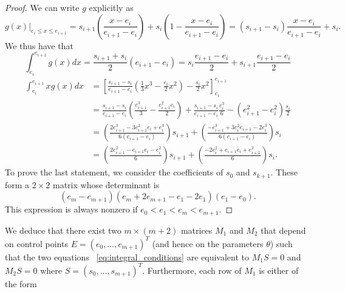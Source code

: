 \documentclass{article}
\begin{document}
\begin{proof} We can write $g$ explicitly as
\begin{equation}
g(x)|_{e_i \le x \le e_{i+1}} = s_{i+1} \left(\frac{x-e_i}{e_{i+1}-e_i}\right)
+ s_ {i} \left(1 -
\frac{x-e_i}{e_{i+1}-e_i}\right) = (s_{i+1} - s_i)\frac{x - e_i}{e_{i+1} - e_i}
+ s_i.
\end{equation}
We thus have that
\begin{equation}
\int_{e_i}^{e_{i+1}} g(x) dx = \frac{s_{i+1} + s_i}{2} (e_{i+1} - e_i) = s_i
\frac{e_{i+1} - e_i}{2} + s_{i+1}\frac{e_{i+1} - e_i}{2}
\end{equation}
\begin{equation}
\begin{aligned}
\int_{e_i}^{e_{i+1}} x g(x) dx &= \left[\frac{s_{i+1} - s_i}{e_{i+1} -
e_i}\left(\frac{1}{3}x^3 -
\frac{e_i}
{2} x^2 \right) - \frac{s_i}{2} x^2\right]^{e_{i+1}}_{e_i} \\
&= \frac{s_{i+1} - s_i}{e_{i+1} -
e_i} \left(\frac{e_{i+1}^3}{3} - \frac{e_{i+1}^2e_i}{2}\right) +
\frac{s_{i+1} - s_i}{e_{i+1} -
e_i} \frac{e_{i}^3}{6} - (e_ {i+1}^2 - e_ {i}^2)\frac{s_i}{2}\\
&= \left(\frac{2e^3_{i+1} -  3 e^2_{i+1}e_i + e_i^3}{6(e_{i+1} -
e_i)} \right) s_{i+1}
+ \left(\frac{-e^3_{i+1} +  3 e_i^2 e_{i+1} - 2e_i^3}{6(e_{i+1} -
e_i)} \right) s_i\\
&= \left(\frac{2e^2_{i+1} -  e_{i+1}e_i - e_i^2}{6}\right) s_{i+1} + 
\left(\frac{-2e^2_{i} +  e_{i+1}e_i + e_{i+1}^2}{6}\right) s_i.
\end{aligned}
\end{equation}
To prove the last statement, we consider the coefficients of $s_0$ and
$s_{k+1}$. These form a $2\times 2$ matrix whose determinant is
\[
(e_m - e_{m+1})(e_m + 2e_{m+1} - e_1 - 2e_1 )(e_1-e_0).
\]
This expression is always nonzero if $e_0 < e_1 < e_m < e_{m+1}$.

\end{proof}



We deduce that there exist two $m \times ({m+2})$ matrices $M_1$ and $M_2$
that depend on control points $E = (e_0,\ldots,e_{m+1})^T$ (and hence on the
parameters $\theta$) such that the two equations~
\eqref{eq:integral_conditions} are equivalent to $M_1 S = 0$ and $M_2 S = 0$
where $S = (s_0,\ldots,s_{m+1})^T$. Furthermore, each row of $M_1$ is either
of the form
\end{document}
